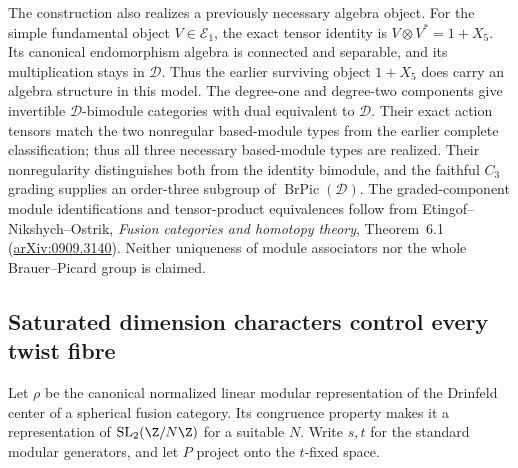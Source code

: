 The construction also realizes a previously necessary algebra object.
For the simple fundamental object $V\in\mathcal E_1$, the exact tensor
identity is $V\otimes V^*=1+X_5$. Its canonical endomorphism algebra
is connected and separable, and its multiplication stays in
$\mathcal D$. Thus the earlier surviving object $1+X_5$ does carry an
algebra structure in this model. The degree-one and degree-two components give invertible
$\mathcal D$-bimodule categories with dual equivalent to $\mathcal D$.
Their exact action tensors match the two nonregular based-module types
from the earlier complete classification; thus all three necessary
based-module types are realized. Their nonregularity distinguishes both
from the identity bimodule, and the faithful $C_3$ grading supplies an
order-three subgroup of $\operatorname{BrPic}(\mathcal D)$. The graded-component module identifications and tensor-product equivalences follow from Etingof--Nikshych--Ostrik, \emph{Fusion categories and homotopy theory}, Theorem~6.1 (\href{https://arxiv.org/abs/0909.3140}{arXiv:0909.3140}). Neither
uniqueness of module associators nor the whole Brauer--Picard group is
claimed.


\subsection{Saturated dimension characters control every twist fibre}
\label{subsec:creative-saturated-conductor}

Let $\rho$ be the canonical normalized linear modular representation of
the Drinfeld center of a spherical fusion category. Its congruence
property makes it a representation of $\mathrm{SL}_2(\Z/N\Z)$ for a
suitable $N$. Write $s,t$ for the standard modular generators, and let
$P$ project onto the $t$-fixed space.

